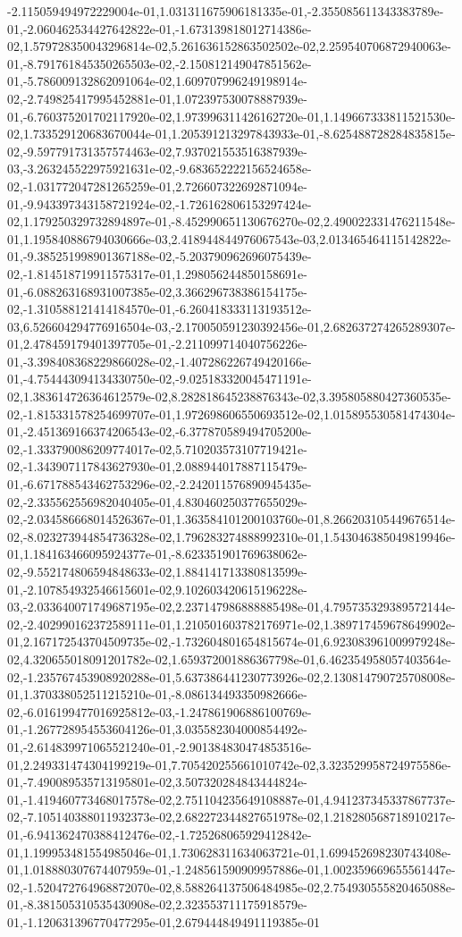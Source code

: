 -2.115059494972229004e-01,1.031311675906181335e-01,-2.355085611343383789e-01,-2.060462534427642822e-01,-1.673139818012714386e-02,1.579728350043296814e-02,5.261636152863502502e-02,2.259540706872940063e-01,-8.791761845350265503e-02,-2.150812149047851562e-01,-5.786009132862091064e-02,1.609707996249198914e-02,-2.749825417995452881e-01,1.072397530078887939e-01,-6.760375201702117920e-02,1.973996311426162720e-01,1.149667333811521530e-02,1.733529120683670044e-01,1.205391213297843933e-01,-8.625488728284835815e-02,-9.597791731357574463e-02,7.937021553516387939e-03,-3.263245522975921631e-02,-9.683652222156524658e-02,-1.031772047281265259e-01,2.726607322692871094e-01,-9.943397343158721924e-02,-1.726162806153297424e-02,1.179250329732894897e-01,-8.452990651130676270e-02,2.490022331476211548e-01,1.195840886794030666e-03,2.418944844976067543e-03,2.013465464115142822e-01,-9.385251998901367188e-02,-5.203790962696075439e-02,-1.814518719911575317e-01,1.298056244850158691e-01,-6.088263168931007385e-02,3.366296738386154175e-02,-1.310588121414184570e-01,-6.260418333113193512e-03,6.526604294776916504e-03,-2.170050591230392456e-01,2.682637274265289307e-01,2.478459179401397705e-01,-2.211099714040756226e-01,-3.398408368229866028e-02,-1.407286226749420166e-01,-4.754443094134330750e-02,-9.025183320045471191e-02,1.383614726364612579e-02,8.282818645238876343e-02,3.395805880427360535e-02,-1.815331578254699707e-01,1.972698606550693512e-02,1.015895530581474304e-01,-2.451369166374206543e-02,-6.377870589494705200e-02,-1.333790086209774017e-02,5.710203573107719421e-02,-1.343907117843627930e-01,2.088944017887115479e-01,-6.671788543462753296e-02,-2.242011576890945435e-02,-2.335562556982040405e-01,4.830460250377655029e-02,-2.034586668014526367e-01,1.363584101200103760e-01,8.266203105449676514e-02,-8.023273944854736328e-02,1.796283274888992310e-01,1.543046385049819946e-01,1.184163466095924377e-01,-8.623351901769638062e-02,-9.552174806594848633e-02,1.884141713380813599e-01,-2.107854932546615601e-02,9.102603420615196228e-03,-2.033640071749687195e-02,2.237147986888885498e-01,4.795735329389572144e-02,-2.402990162372589111e-01,1.210501603782176971e-02,1.389717459678649902e-01,2.167172543704509735e-02,-1.732604801654815674e-01,6.923083961009979248e-02,4.320655018091201782e-02,1.659372001886367798e-01,6.462354958057403564e-02,-1.235767453908920288e-01,5.637386441230773926e-02,2.130814790725708008e-01,1.370338052511215210e-01,-8.086134493350982666e-02,-6.016199477016925812e-03,-1.247861906886100769e-01,-1.267728954553604126e-01,3.035582304000854492e-01,-2.614839971065521240e-01,-2.901384830474853516e-01,2.249331474304199219e-01,7.705420255661010742e-02,3.323529958724975586e-01,-7.490089535713195801e-02,3.507320284843444824e-01,-1.419460773468017578e-02,2.751104235649108887e-01,4.941237345337867737e-02,-7.105140388011932373e-02,2.682272344827651978e-02,1.218280568718910217e-01,-6.941362470388412476e-02,-1.725268065929412842e-01,1.199953481554985046e-01,1.730628311634063721e-01,1.699452698230743408e-01,1.018880307674407959e-01,-1.248561590909957886e-01,1.002359669655561447e-02,-1.520472764968872070e-02,8.588264137506484985e-02,2.754930555820465088e-01,-8.381505310535430908e-02,2.323553711175918579e-01,-1.120631396770477295e-01,2.679444849491119385e-01
